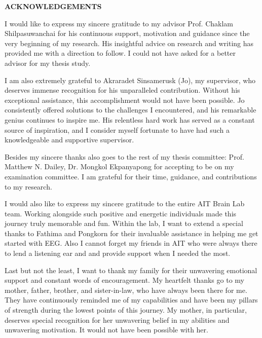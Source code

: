 {}
\begin{center}
    \large{\bf ACKNOWLEDGEMENTS}
\end{center}

I would like to express my sincere gratitude to my advisor Prof. Chaklam Shilpasuwanchai for his continuous support, motivation and guidance since the very beginning of my research. His insightful advice on research and writing has provided me with a direction to follow. I could not have asked for a better advisor for my thesis study.

I am also extremely grateful to Akraradet Sinsamerusk (Jo), my supervisor, who deserves immense recognition for his unparalleled contribution. Without his exceptional assistance, this accomplishment would not have been possible. Jo consistently offered solutions to the challenges I encountered, and his remarkable genius continues to inspire me. His relentless hard work has served as a constant source of inspiration, and I consider myself fortunate to have had such a knowledgeable and supportive supervisor.

Besides my sincere thanks also goes to the rest of my thesis committee: Prof. Matthew N. Dailey, Dr. Mongkol Ekpanyapong for accepting to be on my examination committee. I am grateful for their time, guidance, and contributions to my research.

I would also like to express my sincere gratitude to the entire AIT Brain Lab team. Working alongside such positive and energetic individuals made this journey truly memorable and fun. Within the lab, I want to extend a special thanks to Fathima and Pongkorn for their invaluable assistance in helping me get started with EEG. Also I cannot forget my friends in AIT who were always there to lend a listening ear and and provide support when I needed the most.

Last but not the least, I want to thank my family for their unwavering emotional support and constant words of encouragement. My heartfelt thanks go to my mother, father, brother, and sister-in-law, who have always been there for me. They have continuously reminded me of my capabilities and have been my pillars of strength during the lowest points of this journey. My mother, in particular, deserves special recognition for her unwavering belief in my abilities and unwavering motivation. It would not have been possible with her.


